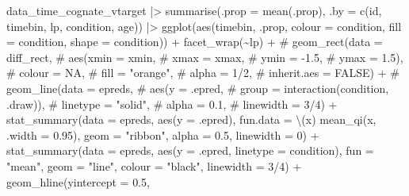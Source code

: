 \documentclass[
  letterpaper,
  DIV=11,
  numbers=noendperiod]{scrartcl}
\newenvironment{Shaded}{\begin{snugshade}}{\end{snugshade}}
\newcommand{\AttributeTok}[1]{\textcolor[rgb]{0.40,0.45,0.13}{#1}}
\newcommand{\CommentTok}[1]{\textcolor[rgb]{0.37,0.37,0.37}{#1}}
\newcommand{\DecValTok}[1]{\textcolor[rgb]{0.68,0.00,0.00}{#1}}
\newcommand{\FloatTok}[1]{\textcolor[rgb]{0.68,0.00,0.00}{#1}}
\newcommand{\FunctionTok}[1]{\textcolor[rgb]{0.28,0.35,0.67}{#1}}
\newcommand{\NormalTok}[1]{\textcolor[rgb]{0.00,0.23,0.31}{#1}}
\newcommand{\SpecialCharTok}[1]{\textcolor[rgb]{0.37,0.37,0.37}{#1}}
\newcommand{\StringTok}[1]{\textcolor[rgb]{0.13,0.47,0.30}{#1}}
\begin{document}
\begin{Shaded}
\begin{Highlighting}[]
\NormalTok{data\_time\_cognate\_vtarget }\SpecialCharTok{|\textgreater{}} 
    \FunctionTok{summarise}\NormalTok{(}\AttributeTok{.prop =} \FunctionTok{mean}\NormalTok{(.prop),}
              \AttributeTok{.by =} \FunctionTok{c}\NormalTok{(id, timebin, lp, condition, age)) }\SpecialCharTok{|\textgreater{}} 
    \FunctionTok{ggplot}\NormalTok{(}\FunctionTok{aes}\NormalTok{(timebin, .prop, }
               \AttributeTok{colour =}\NormalTok{ condition,}
               \AttributeTok{fill =}\NormalTok{ condition,}
               \AttributeTok{shape =}\NormalTok{ condition)) }\SpecialCharTok{+}
    \FunctionTok{facet\_wrap}\NormalTok{(}\SpecialCharTok{\textasciitilde{}}\NormalTok{lp) }\SpecialCharTok{+}
    \CommentTok{\# geom\_rect(data = diff\_rect,}
    \CommentTok{\#         aes(xmin = xmin,}
    \CommentTok{\#           xmax = xmax,}
    \CommentTok{\#           ymin = {-}1.5,}
    \CommentTok{\#           ymax = 1.5),}
    \CommentTok{\#         colour = NA,}
    \CommentTok{\#         fill = "orange",}
    \CommentTok{\#         alpha = 1/2,}
    \CommentTok{\#         inherit.aes = FALSE) +}
    \CommentTok{\# geom\_line(data = epreds,}
    \CommentTok{\#         aes(y = .epred,}
\CommentTok{\#           group = interaction(condition, .draw)),}
\CommentTok{\#         linetype = "solid",}
\CommentTok{\#         alpha = 0.1,}
\CommentTok{\#         linewidth = 3/4) +}
\FunctionTok{stat\_summary}\NormalTok{(}\AttributeTok{data =}\NormalTok{ epreds,}
             \FunctionTok{aes}\NormalTok{(}\AttributeTok{y =}\NormalTok{ .epred),}
             \AttributeTok{fun.data =}\NormalTok{ \textbackslash{}(x) }\FunctionTok{mean\_qi}\NormalTok{(x, }\AttributeTok{.width =} \FloatTok{0.95}\NormalTok{),}
             \AttributeTok{geom =} \StringTok{"ribbon"}\NormalTok{,}
             \AttributeTok{alpha =} \FloatTok{0.5}\NormalTok{,}
             \AttributeTok{linewidth =} \DecValTok{0}\NormalTok{) }\SpecialCharTok{+}
    \FunctionTok{stat\_summary}\NormalTok{(}\AttributeTok{data =}\NormalTok{ epreds,}
                 \FunctionTok{aes}\NormalTok{(}\AttributeTok{y =}\NormalTok{ .epred,}
                    \AttributeTok{linetype =}\NormalTok{ condition),}
                 \AttributeTok{fun =} \StringTok{"mean"}\NormalTok{,}
                 \AttributeTok{geom =} \StringTok{"line"}\NormalTok{,}
                 \AttributeTok{colour =} \StringTok{"black"}\NormalTok{,}
                 \AttributeTok{linewidth =} \DecValTok{3}\SpecialCharTok{/}\DecValTok{4}\NormalTok{) }\SpecialCharTok{+}
    \FunctionTok{geom\_hline}\NormalTok{(}\AttributeTok{yintercept =} \FloatTok{0.5}\NormalTok{, }

\end{Highlighting}
\end{Shaded}
\end{document}
